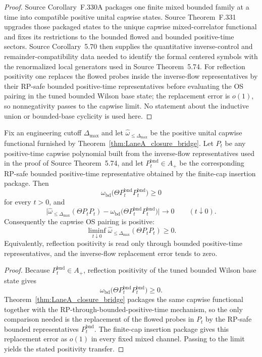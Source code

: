 \begin{proof}
Source Corollary~F.330A packages one finite mixed bounded family at a time into compatible positive unital capwise states. Source Theorem~F.331 upgrades those packaged states to the unique capwise mixed-correlator functional and fixes its restrictions to the bounded flowed and bounded positive-time sectors. Source Corollary~5.70 then supplies the quantitative inverse-control and remainder-compatibility data needed to identify the formal centered symbols with the renormalized local generators used in Source Theorem~5.74. For reflection positivity one replaces the flowed probes inside the inverse-flow representatives by their RP-safe bounded positive-time representatives before evaluating the OS pairing in the tuned bounded Wilson base state; the replacement error is $o(1)$, so nonnegativity passes to the capwise limit. No statement about the inductive union or bounded-base cyclicity is used here.
\end{proof}

\begin{lemma}\label{lem:LaneA_finite_cap_positivity_mechanism}
Fix an engineering cutoff $\Delta_{\max}$ and let $\widehat\omega_{\le \Delta_{\max}}$ be the positive unital capwise functional furnished by Theorem~\ref{thm:LaneA_closure_bridge}. Let $P_t$ be any positive-time capwise polynomial built from the inverse-flow representatives used in the proof of Source Theorem~5.74, and let $P_t^{\mathrm{bnd}}\in A_+$ be the corresponding RP-safe bounded positive-time representative obtained by the finite-cap insertion package. Then
\[
\omega_{\mathrm{bd}}\bigl(\Theta P_t^{\mathrm{bnd}} P_t^{\mathrm{bnd}}\bigr)\ge 0
\]
for every $t>0$, and
\[
\bigl|\widehat\omega_{\le \Delta_{\max}}(\Theta P_t P_t)-\omega_{\mathrm{bd}}\bigl(\Theta P_t^{\mathrm{bnd}} P_t^{\mathrm{bnd}}\bigr)\bigr|\longrightarrow 0
\qquad (t\downarrow 0).
\]
Consequently the capwise OS pairing is positive:
\[
\liminf_{t\downarrow 0}\widehat\omega_{\le \Delta_{\max}}(\Theta P_t P_t)\ge 0.
\]
Equivalently, reflection positivity is read only through bounded positive-time representatives, and the inverse-flow replacement error tends to zero.
\end{lemma}

\begin{proof}
Because $P_t^{\mathrm{bnd}}\in A_+$, reflection positivity of the tuned bounded Wilson base state gives
\[
\omega_{\mathrm{bd}}\bigl(\Theta P_t^{\mathrm{bnd}} P_t^{\mathrm{bnd}}\bigr)\ge 0.
\]
Theorem~\ref{thm:LaneA_closure_bridge} packages the same capwise functional together with the RP-through-bounded-positive-time mechanism, so the only comparison needed is the replacement of the flowed probes in $P_t$ by the RP-safe bounded representatives $P_t^{\mathrm{bnd}}$. The finite-cap insertion package gives this replacement error as $o(1)$ in every fixed mixed channel. Passing to the limit yields the stated positivity transfer.
\end{proof}

